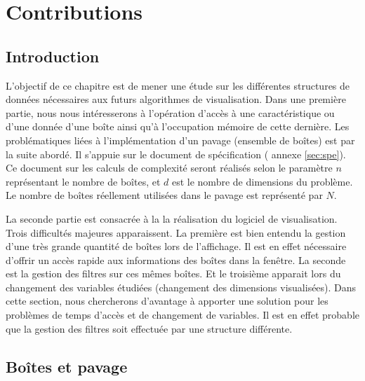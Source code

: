 \chapter{Contributions}\label{chap:con}


\section{Introduction}%

L'objectif de ce chapitre est de mener une étude sur les différentes structures de données nécessaires aux futurs algorithmes de visualisation. Dans une première partie, nous nous intéresserons à l'opération d'accès à une caractéristique ou d'une donnée d'une boîte ainsi qu'à l'occupation mémoire de cette dernière. Les problématiques liées à l'implémentation d'un pavage (ensemble de boîtes) est par la suite abordé. Il s'appuie sur le document de spécification (\cf{}  annexe \ref{sec:spe}). Ce document sur les calculs de complexité seront réalisés selon le paramètre $n$  représentant le nombre de boîtes, et $d$ est le nombre de dimensions du problème. Le nombre de boîtes réellement utilisées dans le pavage est représenté par $N$. 


La seconde partie est consacrée à la la réalisation du logiciel de visualisation. Trois difficultés majeures apparaissent. La première est bien entendu la gestion d'une très grande quantité de boîtes lors de l'affichage. Il est en effet nécessaire d'offrir un accès rapide aux informations des boîtes dans la fenêtre. La seconde est la gestion des filtres sur ces mêmes boîtes. Et le troisième apparait lors du changement des variables étudiées (changement des dimensions visualisées). Dans cette section, nous chercherons d'avantage à apporter une solution pour les problèmes de temps d'accès et de changement de variables. Il est en effet probable que la gestion des filtres soit effectuée par une structure différente.





\section{Boîtes et pavage}

